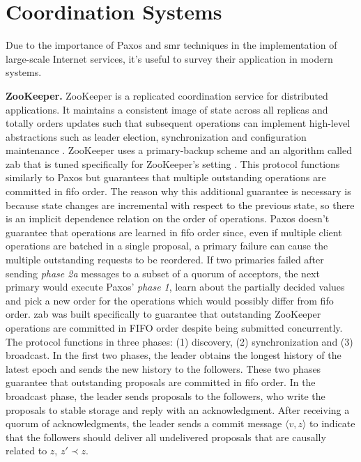 \section{Coordination Systems} \label{Coordination Systems}
Due to the importance of Paxos and \acrshort{smr} techniques in the implementation of large-scale Internet services, it's useful to survey their application in modern systems.\par
\textbf{ZooKeeper.} ZooKeeper is a replicated coordination service for distributed applications. It maintains a consistent image of state across all replicas and totally orders updates such that subsequent operations can implement high-level abstractions such as leader election, synchronization and configuration maintenance \cite{Hunt2010}. ZooKeeper uses a primary-backup scheme and an algorithm called \acrfull{zab} that is tuned specifically for ZooKeeper's setting \cite{Junqueira2011}. This protocol functions similarly to Paxos but guarantees that multiple outstanding operations are committed in \acrfull{fifo} order. The reason why this additional guarantee is necessary is because state changes are incremental with respect to the previous state, so there is an implicit dependence relation on the order of operations. Paxos doesn't guarantee that operations are learned in \acrshort{fifo} order since, even if multiple client operations are batched in a single proposal, a primary failure can cause the multiple outstanding requests to be reordered. If two primaries failed after sending \textit{phase 2a} messages to a subset of a quorum of acceptors, the next primary would execute Paxos' \textit{phase 1}, learn about the partially decided values and pick a new order for the operations which would possibly differ from \acrshort{fifo} order. \acrshort{zab} was built specifically to guarantee that outstanding ZooKeeper operations are committed in FIFO order despite being submitted concurrently. The protocol functions in three phases: (1) discovery, (2) synchronization and (3) broadcast. In the  first two phases, the leader obtains the longest history of the latest epoch and sends the new history to the followers. These two phases guarantee that outstanding proposals are committed in \acrshort{fifo} order. In the broadcast phase, the leader sends proposals to the followers, who write the proposals to stable storage and reply with an acknowledgment. After receiving a quorum of acknowledgments, the leader sends a commit message $\langle v,z \rangle$ to indicate that the followers should deliver all undelivered proposals that are causally related to $z$, $z' \prec z$. \par
